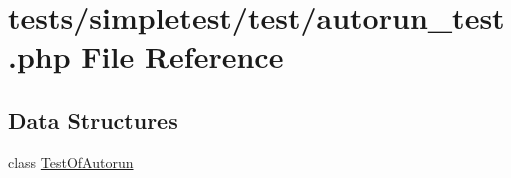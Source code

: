 \hypertarget{autorun__test_8php}{\section{tests/simpletest/test/autorun\-\_\-test.php File Reference}
\label{autorun__test_8php}
}
\subsection*{Data Structures}
\begin{DoxyCompactItemize}
\item 
class \hyperlink{class_test_of_autorun}{Test\-Of\-Autorun}
\end{DoxyCompactItemize}
